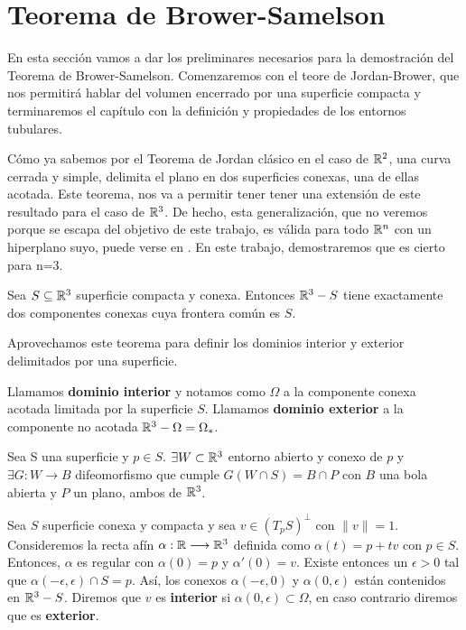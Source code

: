 \section{Teorema de Brower-Samelson}

En esta sección vamos a dar los preliminares necesarios para la demostración del Teorema de Brower-Samelson. Comenzaremos con el teore de Jordan-Brower, que nos permitirá hablar del volumen encerrado por una superficie compacta y terminaremos el capítulo con la definición y propiedades de los entornos tubulares.

Cómo ya sabemos por el Teorema de Jordan clásico en el caso de $\mathbb{R}^2$, una curva cerrada y simple, delimita el plano en dos superficies conexas, una de ellas acotada. Este teorema, nos va a permitir tener tener una extensión de este resultado para el caso de $\mathbb{R}^3$. De hecho, esta generalización, que no veremos porque se escapa del objetivo de este trabajo, es válida para todo $\mathbb{R}^n$ con un hiperplano suyo, puede verse en \cite{paperchicago}. En este trabajo, demostraremos que es cierto para n=3.

\begin{theorem}
Sea $S \subseteq \mathbb{R}^3$ superficie compacta y conexa. Entonces $\mathbb{R}^3 - S$ tiene exactamente dos componentes conexas cuya frontera común es $S$.
\end{theorem}

Aprovechamos este teorema para definir los dominios interior y exterior delimitados por una superficie.

\begin{definition}
Llamamos \textbf{dominio interior} y notamos como $\Omega$ a la componente conexa acotada limitada por la superficie $S$. Llamamos \textbf{dominio exterior} a la componente no acotada $\mathbb{R}^3 - \Omega=\Omega_{*}$.
\end{definition}

\begin{lemma}
Sea S una superficie y $p \in S$. $\exists W \subset \mathbb{R}^3$ entorno abierto y conexo de $p$ y $\exists G: W \longrightarrow B$ difeomorfismo que cumple $G(W\cap S) = B\cap P$ con $B$ una bola abierta y $P$ un plano, ambos de $\mathbb{R}^3$.
\end{lemma}

\begin{definition}
Sea $S$ superficie conexa y compacta y sea $v \in (T_pS)^{\perp}$ con $\lVert v\rVert=1$. Consideremos la recta afín $\alpha: \mathbb{R} \longrightarrow \mathbb{R}^3$ definida como $\alpha(t) = p + tv$ con $p \in S$. Entonces, $\alpha$ es regular con $\alpha(0)=p$ y $\alpha'(0) = v$. Existe entonces un $\epsilon  >  0$ tal que $\alpha(-\epsilon, \epsilon) \cap S = {p}$. Así, los conexos $\alpha(-\epsilon, 0)$ y $\alpha(0, \epsilon)$ están contenidos en $\mathbb{R}^3 - S$. Diremos que $v$ es \textbf{interior} si $\alpha(0, \epsilon) \subset \Omega$, en caso contrario diremos que es \textbf{exterior}.
\end{definition}


